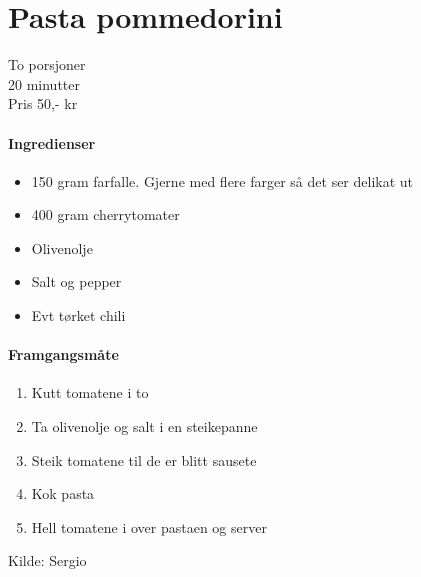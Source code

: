 \section{Pasta pommedorini}
\label{pommedorini}

To porsjoner\\
20 minutter\\
Pris 50,- kr

\paragraph{Ingredienser}
\begin{itemize}[noitemsep]
	\item 150 gram farfalle. Gjerne med flere farger så det ser delikat ut
	\item 400 gram cherrytomater
	\item Olivenolje
  \item Salt og pepper
  \item Evt tørket chili
\end{itemize}

\paragraph{Framgangsmåte}
\begin{enumerate}[noitemsep]
	\item Kutt tomatene i to
	\item Ta olivenolje og salt i en steikepanne
	\item Steik tomatene til de er blitt sausete
	\item Kok pasta
	\item Hell tomatene i over pastaen og server
\end{enumerate}


Kilde: Sergio
